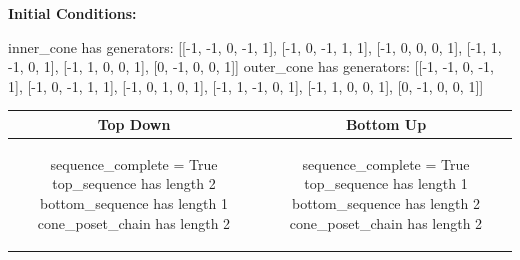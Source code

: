 \documentclass[10pt]{article}
\begin{document}
\textbf{Initial Conditions:}
\begin{SAGE}
inner_cone has generators: 
[[-1, -1, 0, -1, 1], [-1, 0, -1, 1, 1], [-1, 0, 0, 0, 1], [-1, 1, -1, 0, 1], [-1, 1, 0, 0, 1], [0, -1, 0, 0, 1]]
outer_cone has generators: 
[[-1, -1, 0, -1, 1], [-1, 0, -1, 1, 1], [-1, 0, 1, 0, 1], [-1, 1, -1, 0, 1], [-1, 1, 0, 0, 1], [0, -1, 0, 0, 1]]

\end{SAGE}
\begin{tabular}{c|c}
\textbf{Top Down} & \textbf{Bottom Up} \\ \hline  
\begin{SAGE}
sequence_complete = True
top_sequence has length 2
bottom_sequence has length 1
cone_poset_chain has length 2
\end{SAGE} 
&
\begin{SAGE}
sequence_complete = True
top_sequence has length 1
bottom_sequence has length 2
cone_poset_chain has length 2
\end{SAGE} 
\\ \hline


\end{tabular}
\end{document}
